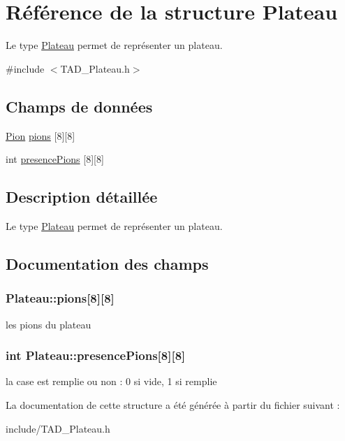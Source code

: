 \hypertarget{structPlateau}{}\section{Référence de la structure Plateau}
\label{structPlateau}


Le type \hyperlink{structPlateau}{Plateau} permet de représenter un plateau.  




{\ttfamily \#include $<$T\+A\+D\+\_\+\+Plateau.\+h$>$}

\subsection*{Champs de données}
\begin{DoxyCompactItemize}
\item 
\hyperlink{structPion}{Pion} \hyperlink{structPlateau_a3a5262d16cd0c70d7beb0063c89e8eab}{pions} \mbox{[}8\mbox{]}\mbox{[}8\mbox{]}
\item 
int \hyperlink{structPlateau_a19cf42d21ac3b82250c46e32d3276bda}{presence\+Pions} \mbox{[}8\mbox{]}\mbox{[}8\mbox{]}
\end{DoxyCompactItemize}


\subsection{Description détaillée}
Le type \hyperlink{structPlateau}{Plateau} permet de représenter un plateau. 

\subsection{Documentation des champs}
\hypertarget{structPlateau_a3a5262d16cd0c70d7beb0063c89e8eab}{}
\subsubsection[{pions}]{ Plateau\+::pions\mbox{[}8\mbox{]}\mbox{[}8\mbox{]}}\label{structPlateau_a3a5262d16cd0c70d7beb0063c89e8eab}
les pions du plateau \hypertarget{structPlateau_a19cf42d21ac3b82250c46e32d3276bda}{}
\subsubsection[{presence\+Pions}]{\setlength{\rightskip}{0pt plus 5cm}int Plateau\+::presence\+Pions\mbox{[}8\mbox{]}\mbox{[}8\mbox{]}}\label{structPlateau_a19cf42d21ac3b82250c46e32d3276bda}
la case est remplie ou non \+: 0 si vide, 1 si remplie 

La documentation de cette structure a été générée à partir du fichier suivant \+:\begin{DoxyCompactItemize}
\item 
include/T\+A\+D\+\_\+\+Plateau.\+h\end{DoxyCompactItemize}

